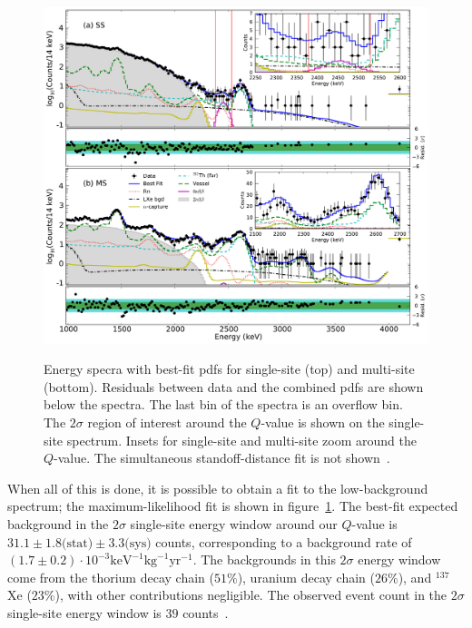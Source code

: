 \begin{figure}
\begin{center}
\includegraphics[keepaspectratio=true,width=\textwidth]{Energy_BestFit_frompaper.pdf}
\end{center}
\renewcommand{\baselinestretch}{1}
\small\normalsize
\begin{quote}
\caption{Energy specra with best-fit pdfs for single-site (top) and multi-site (bottom).  Residuals between data and the combined pdfs are shown below the spectra.  The last bin of the spectra is an overflow bin.  The $2\sigma$ region of interest around the $Q$-value is shown on the single-site spectrum.  Insets for single-site and multi-site zoom around the $Q$-value.  The simultaneous standoff-distance fit is not shown~\cite{NewEXObb0nPaper_2014}.}
\label{fig:BestFitEnergyFromPaper}
\end{quote}
\end{figure}
\renewcommand{\baselinestretch}{2}
\small\normalsize

When all of this is done, it is possible to obtain a fit to the low-background spectrum; the maximum-likelihood fit is shown in figure~\ref{fig:BestFitEnergyFromPaper}.  The best-fit expected background in the $2\sigma$ single-site energy window around our $Q$-value is $31.1 \pm 1.8\text{(stat)} \pm 3.3\text{(sys)}$ counts, corresponding to a background rate of $(1.7 \pm 0.2)\cdot 10^{-3} \text{keV}^{-1} \text{kg}^{−1} \text{yr}^{−1}$.  The backgrounds in this $2\sigma$ energy window come from the thorium decay chain ($51\%$), uranium decay chain ($26\%$), and $^{137}$Xe ($23\%$), with other contributions negligible.  The observed event count in the $2\sigma$ single-site energy window is $39$ counts~\cite{NewEXObb0nPaper_2014}.

